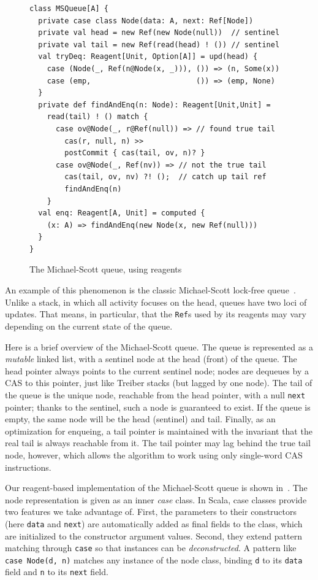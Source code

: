 \documentclass[preprint,nocopyrightspace]{sigplanconf}
\begin{document}
\begin{figure}
\begin{lstlisting}[frame=single]
class MSQueue[A] {
  private case class Node(data: A, next: Ref[Node])
  private val head = new Ref(new Node(null))  // sentinel
  private val tail = new Ref(read(head) ! ()) // sentinel
  val tryDeq: Reagent[Unit, Option[A]] = upd(head) {
    case (Node(_, Ref(n@Node(x, _))), ()) => (n, Some(x))
    case (emp,                        ()) => (emp, None)
  }
  private def findAndEnq(n: Node): Reagent[Unit,Unit] = 
    read(tail) ! () match {
      case ov@Node(_, r@Ref(null)) => // found true tail
        cas(r, null, n) >>
        postCommit { cas(tail, ov, n)? }
      case ov@Node(_, Ref(nv)) => // not the true tail
        cas(tail, ov, nv) ?! ();  // catch up tail ref
        findAndEnq(n)
    }
  val enq: Reagent[A, Unit] = computed { 
    (x: A) => findAndEnq(new Node(x, new Ref(null)))
  }
}
\end{lstlisting}
\nocaptionrule
\caption{The Michael-Scott queue, using reagents}
\label{fig:msqueue}
\end{figure}

An example of this phenomenon is the classic Michael-Scott lock-free
queue~\cite{Michael1996}.  Unlike a stack, in which all activity focuses on
the head, queues have two loci of updates.  That means, in particular, that
the \lstinline{Ref}s used by its reagents may vary depending on the current
state of the queue.

Here is a brief overview of the Michael-Scott queue.  The queue is represented
as a \emph{mutable} linked list, with a sentinel node at the head (front) of the
queue.  The head pointer always points to the current sentinel node; nodes are
dequeues by a CAS to this pointer, just like Treiber stacks (but lagged by one
node).  The tail of the queue is the unique node, reachable from the head
pointer, with a null \lstinline{next} pointer; thanks to the sentinel, such a
node is guaranteed to exist.  If the queue is empty, the same node will be the
head (sentinel) and tail.  Finally, as an optimization for enqueing, a tail
pointer is maintained with the invariant that the real tail is always reachable
from it.  The tail pointer may lag behind the true tail node, however, which
allows the algorithm to work using only single-word CAS instructions.

Our reagent-based implementation of the Michael-Scott queue is shown
in~.  The node representation is given as an inner \emph{case}
class.  In Scala, case classes provide two features we take advantage of.
First, the parameters to their constructors (here \lstinline{data} and
\lstinline{next}) are automatically added as final fields to the class, which
are initialized to the constructor argument values.  Second, they extend
pattern matching through \lstinline{case} so that instances can be
\emph{deconstructed}.  A pattern like \lstinline{case Node(d, n)} matches any
instance of the node class, binding \lstinline{d} to its \lstinline{data}
field and \lstinline{n} to its \lstinline{next} field.
\end{document}
